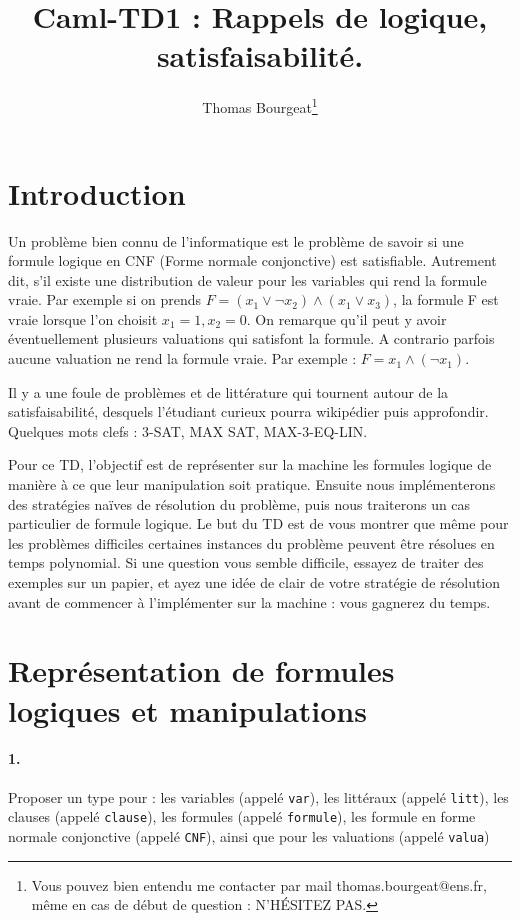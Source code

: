 \documentclass[10pt,a4paper]{article}
\begin{document}
\title{Caml-TD1 : Rappels de logique, satisfaisabilité.}
\author{Thomas Bourgeat\footnote{Vous pouvez bien entendu me contacter par mail thomas.bourgeat@ens.fr, même en cas de début de question : N'HÉSITEZ PAS.}}
\maketitle{}

\section{Introduction}
Un problème bien connu de l'informatique est le problème de savoir si une formule logique en CNF (Forme normale conjonctive) est satisfiable. Autrement dit, s'il existe une distribution de valeur pour les variables qui rend la formule vraie. Par exemple si on prends $F=(x_1\lor \neg x_2)\land(x_1\lor x_3)$, la formule F est vraie lorsque l'on choisit $x_1=1,x_2=0$. On remarque qu'il peut y avoir éventuellement plusieurs valuations qui satisfont la formule. A contrario parfois aucune valuation ne rend la formule vraie. Par exemple : $F=x_1\land (\neg x_1)$. 

Il y a une foule de problèmes et de littérature qui tournent autour de la satisfaisabilité, desquels l'étudiant curieux pourra wikipédier puis approfondir. Quelques mots clefs : 3-SAT, MAX SAT, MAX-3-EQ-LIN.

Pour ce TD, l'objectif est de représenter sur la machine les formules logique de manière à ce que leur manipulation soit pratique. Ensuite nous implémenterons des stratégies naïves de résolution du problème, puis nous traiterons un cas particulier de formule logique. Le but du TD est de vous montrer que même pour les problèmes difficiles certaines instances du problème peuvent être résolues en temps polynomial. Si une question vous semble difficile, essayez de traiter des exemples sur un papier, et ayez une idée de clair de votre stratégie de résolution avant de commencer à l'implémenter sur la machine : vous gagnerez du temps.

\section{Représentation de formules logiques et manipulations}

\paragraph{1.} Proposer un type pour : les variables (appelé \texttt{var}), les littéraux (appelé \texttt{litt}), les clauses (appelé \texttt{clause}), les formules (appelé \texttt{formule}), les formule en forme normale conjonctive (appelé \texttt{CNF}), ainsi que pour les valuations (appelé \texttt{valua})
\end{document}
